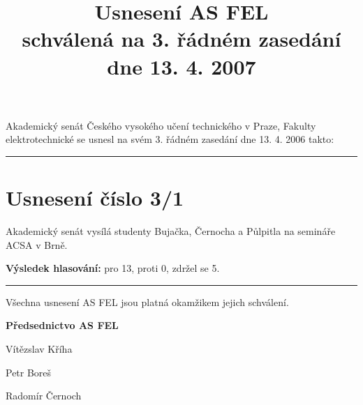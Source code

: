 \documentclass[a4paper,12pt,notitlepage]{article}
\title{Usnesení AS FEL\\schválená na 3. řádném zasedání dne 13. 4. 2007}
\author{}\date{}
\newcommand{\hr}{\bigskip\bigskip\hrule\bigskip\bigskip}
\newcommand{\usneseni}[5]{
\section*{#1}

#2

\textbf{Výsledek hlasování:} pro #3, proti #4, zdržel se #5.}
\begin{document}
\maketitle
\thispagestyle{empty}


Akademický senát Českého vysokého učení technického v Praze, Fakulty
elektrotechnické se usnesl na svém 3. řádném zasedání dne 13. 4. 2006 takto:\hr



\usneseni{Usnesení číslo 3/1}{Akademický senát vysílá studenty Bujačka, Černocha a Půlpitla na semináře ACSA v Brně.}{13}{0}{5}



\bigskip\bigskip\bigskip\bigskip\bigskip\bigskip\hr
Všechna usnesení AS FEL jsou platná okamžikem jejich schválení.

\begin{center}
\textbf{Předsednictvo AS FEL}

Vítězslav Kříha

Petr Boreš

Radomír Černoch
\end{center}
\end{document}
